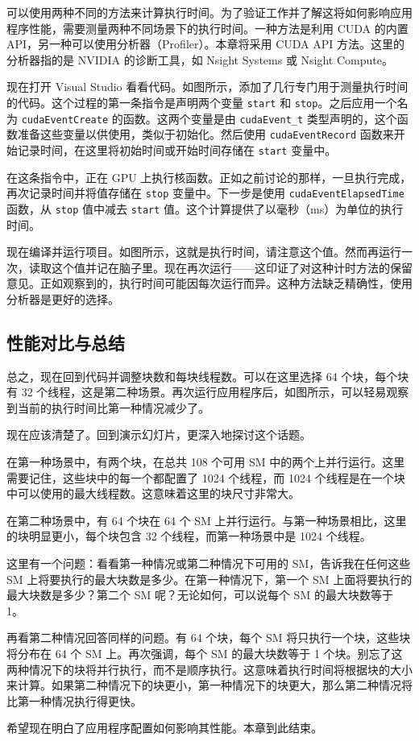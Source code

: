 可以使用两种不同的方法来计算执行时间。为了验证工作并了解这将如何影响应用程序性能，需要测量两种不同场景下的执行时间。一种方法是利用 CUDA 的内置 API，另一种可以使用分析器（Profiler）。本章将采用 CUDA API 方法。这里的分析器指的是 NVIDIA 的诊断工具，如 Nsight Systems 或 Nsight Compute。

现在打开 Visual Studio 看看代码。如图所示，添加了几行专门用于测量执行时间的代码。这个过程的第一条指令是声明两个变量 \texttt{start} 和 \texttt{stop}。之后应用一个名为 \texttt{cudaEventCreate} 的函数。这两个变量是由 \texttt{cudaEvent\_t} 类型声明的，这个函数准备这些变量以供使用，类似于初始化。然后使用 \texttt{cudaEventRecord} 函数来开始记录时间，在这里将初始时间或开始时间存储在 \texttt{start} 变量中。

在这条指令中，正在 GPU 上执行核函数。正如之前讨论的那样，一旦执行完成，再次记录时间并将值存储在 \texttt{stop} 变量中。下一步是使用 \texttt{cudaEventElapsedTime} 函数，从 \texttt{stop} 值中减去 \texttt{start} 值。这个计算提供了以毫秒（ms）为单位的执行时间。

现在编译并运行项目。如图所示，这就是执行时间，请注意这个值。然而再运行一次，读取这个值并记在脑子里。现在再次运行——这印证了对这种计时方法的保留意见。正如观察到的，执行时间可能因每次运行而异。这种方法缺乏精确性，使用分析器是更好的选择。

\subsection{性能对比与总结}

总之，现在回到代码并调整块数和每块线程数。可以在这里选择 64 个块，每个块有 32 个线程，这是第二种场景。再次运行应用程序后，如图所示，可以轻易观察到当前的执行时间比第一种情况减少了。

现在应该清楚了。回到演示幻灯片，更深入地探讨这个话题。

在第一种场景中，有两个块，在总共 108 个可用 SM 中的两个上并行运行。这里需要记住，这些块中的每一个都配置了 1024 个线程，而 1024 个线程是在一个块中可以使用的最大线程数。这意味着这里的块尺寸非常大。

在第二种场景中，有 64 个块在 64 个 SM 上并行运行。与第一种场景相比，这里的块明显更小，每个块包含 32 个线程，而第一种场景中是 1024 个线程。

这里有一个问题：看看第一种情况或第二种情况下可用的 SM，告诉我在任何这些 SM 上将要执行的最大块数是多少。在第一种情况下，第一个 SM 上面将要执行的最大块数是多少？第二个 SM 呢？无论如何，可以说每个 SM 的最大块数等于 1。

再看第二种情况回答同样的问题。有 64 个块，每个 SM 将只执行一个块，这些块将分布在 64 个 SM 上。再次强调，每个 SM 的最大块数等于 1 个块。别忘了这两种情况下的块将并行执行，而不是顺序执行。这意味着执行时间将根据块的大小来计算。如果第二种情况下的块更小，第一种情况下的块更大，那么第二种情况将比第一种情况执行得更快。

希望现在明白了应用程序配置如何影响其性能。本章到此结束。

